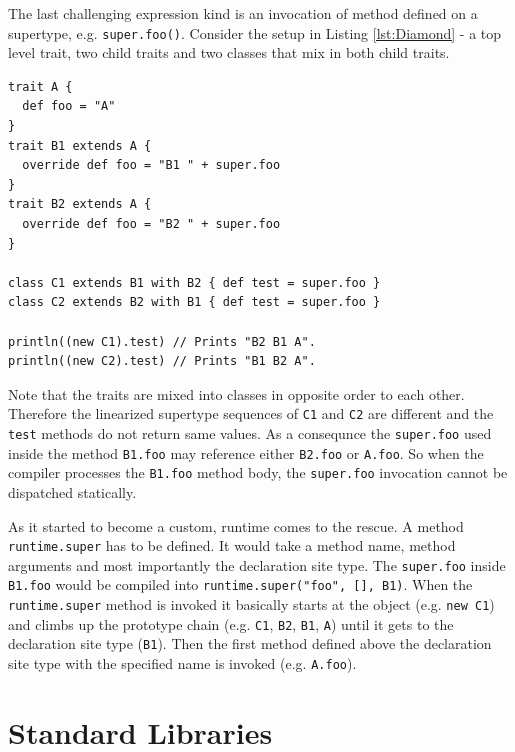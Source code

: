 \documentclass[12pt,a4paper]{report}
\begin{document}
The last challenging expression kind is an invocation of method defined on a supertype, e.g. \texttt{super.foo()}. Consider the setup in Listing \ref{lst:Diamond} - a top level trait, two child traits and two classes that mix in both child traits.

\begin{minipage}{\linewidth}
\begin{lstlisting}[caption={The \texttt{super} keyword non-static behavior example.},label={lst:Diamond}]
trait A { 
  def foo = "A" 
}
trait B1 extends A { 
  override def foo = "B1 " + super.foo
}
trait B2 extends A { 
  override def foo = "B2 " + super.foo
}

class C1 extends B1 with B2 { def test = super.foo }
class C2 extends B2 with B1 { def test = super.foo }

println((new C1).test) // Prints "B2 B1 A".
println((new C2).test) // Prints "B1 B2 A".
\end{lstlisting}
\end{minipage}

Note that the traits are mixed into classes in opposite order to each other. Therefore the linearized supertype sequences of \texttt{C1} and \texttt{C2} are different and the \texttt{test} methods do not return same values. As a consequnce the \texttt{super.foo} used inside the method \texttt{B1.foo} may reference either \texttt{B2.foo} or \texttt{A.foo}. So when the compiler processes the \texttt{B1.foo} method body, the \texttt{super.foo} invocation cannot be dispatched statically.

As it started to become a custom, runtime comes to the rescue. A method \texttt{runtime.super} has to be defined. It would take a method name, method arguments and most importantly the declaration site type. The \texttt{super.foo} inside \texttt{B1.foo} would be compiled into \texttt{runtime.super("foo", [], B1)}. When the \texttt{runtime.super} method is invoked it basically starts at the object (e.g. \texttt{new C1}) and climbs up the prototype chain (e.g. \texttt{C1}, \texttt{B2}, \texttt{B1}, \texttt{A}) until it gets to the declaration site type (\texttt{B1}). Then the first method defined above the declaration site type with the specified name is invoked (e.g. \texttt{A.foo}).

\section{Standard Libraries}
\end{document}

